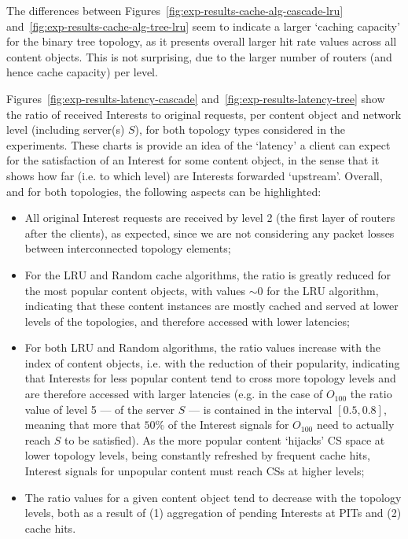 The differences between 
Figures~\ref{fig:exp-results-cache-alg-cascade-lru} 
and~\ref{fig:exp-results-cache-alg-tree-lru} seem to indicate a larger `caching 
capacity' for the binary tree topology, as it presents overall larger hit rate 
values across all content objects. This is not surprising, due to the 
larger number of routers (and hence cache capacity) per level.\shortvertbreak

Figures~\ref{fig:exp-results-latency-cascade} and~\ref{fig:exp-results-latency-tree} show 
the ratio of received Interests to original requests, per content object 
and network level (including server(s) $S$), for both topology types considered in the 
experiments. These charts is provide an idea of the `latency' a client can expect for 
the satisfaction of an Interest for some content object, in the sense that it shows how far (i.e. to 
which level) are Interests forwarded `upstream'. Overall, and for both topologies, 
the following aspects can be highlighted: 

\begin{itemize}
    \item All original Interest requests are 
        received by level 2 (the first layer of routers after the clients), as expected, since 
        we are not considering any packet losses between interconnected topology elements;
    \item For the LRU and Random cache algorithms, the ratio is greatly reduced for 
        the most popular content objects, with values $\sim0$ for the LRU algorithm, 
        indicating that these content instances are mostly cached and served at 
        lower levels of the topologies, and therefore accessed with lower latencies;
    \item For both LRU and Random algorithms, the ratio values increase with the index of 
        content objects, i.e. with the reduction of their popularity, indicating that 
        Interests for less popular content tend to cross more topology levels and 
        are therefore accessed with larger latencies (e.g. in the case of $O_{100}$ 
        the ratio value of level 5 --- of the server $S$ --- is contained in the 
        interval $[0.5, 0.8]$, meaning 
        that more that $50\%$ of the Interest signals for $O_{100}$ need to actually 
        reach $S$ to be satisfied). As the more popular content `hijacks' CS space 
        at lower topology levels, being constantly refreshed by frequent cache 
        hits, Interest signals for unpopular content must reach CSs at higher levels;
    \item The ratio values for a given content object tend to decrease with the topology 
        levels, both as a result of (1) aggregation of pending Interests at PITs and 
        (2) cache hits.
\end{itemize}\shortvertbreak

